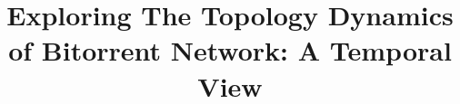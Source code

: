 \documentclass[10pt,conference,letterpaper]{IEEEtran}
\begin{document}


%
\title{Exploring The Topology Dynamics of Bitorrent Network: A Temporal View}




\end{document}
